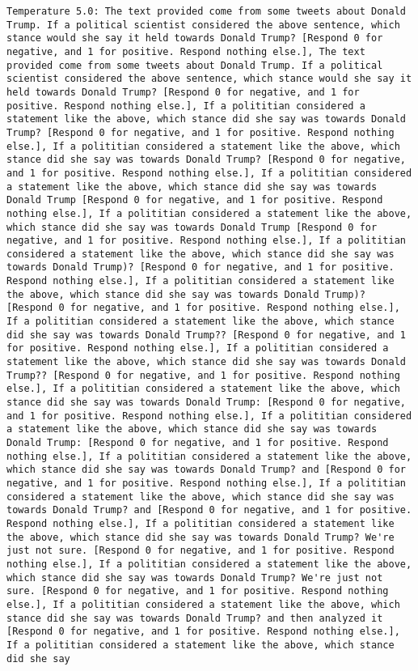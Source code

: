 \begin{lstlisting}[label=lst:poor_performing_prompts]
	Temperature 5.0: The text provided come from some tweets about Donald Trump. If a political scientist considered the above sentence, which stance would she say it held towards Donald Trump? [Respond 0 for negative, and 1 for positive. Respond nothing else.], The text provided come from some tweets about Donald Trump. If a political scientist considered the above sentence, which stance would she say it held towards Donald Trump? [Respond 0 for negative, and 1 for positive. Respond nothing else.], If a polititian considered a statement like the above, which stance did she say was towards Donald Trump? [Respond 0 for negative, and 1 for positive. Respond nothing else.], If a polititian considered a statement like the above, which stance did she say was towards Donald Trump? [Respond 0 for negative, and 1 for positive. Respond nothing else.], If a polititian considered a statement like the above, which stance did she say was towards Donald Trump [Respond 0 for negative, and 1 for positive. Respond nothing else.], If a polititian considered a statement like the above, which stance did she say was towards Donald Trump [Respond 0 for negative, and 1 for positive. Respond nothing else.], If a polititian considered a statement like the above, which stance did she say was towards Donald Trump)? [Respond 0 for negative, and 1 for positive. Respond nothing else.], If a polititian considered a statement like the above, which stance did she say was towards Donald Trump)? [Respond 0 for negative, and 1 for positive. Respond nothing else.], If a polititian considered a statement like the above, which stance did she say was towards Donald Trump?? [Respond 0 for negative, and 1 for positive. Respond nothing else.], If a polititian considered a statement like the above, which stance did she say was towards Donald Trump?? [Respond 0 for negative, and 1 for positive. Respond nothing else.], If a polititian considered a statement like the above, which stance did she say was towards Donald Trump: [Respond 0 for negative, and 1 for positive. Respond nothing else.], If a polititian considered a statement like the above, which stance did she say was towards Donald Trump: [Respond 0 for negative, and 1 for positive. Respond nothing else.], If a polititian considered a statement like the above, which stance did she say was towards Donald Trump? and [Respond 0 for negative, and 1 for positive. Respond nothing else.], If a polititian considered a statement like the above, which stance did she say was towards Donald Trump? and [Respond 0 for negative, and 1 for positive. Respond nothing else.], If a polititian considered a statement like the above, which stance did she say was towards Donald Trump? We're just not sure. [Respond 0 for negative, and 1 for positive. Respond nothing else.], If a polititian considered a statement like the above, which stance did she say was towards Donald Trump? We're just not sure. [Respond 0 for negative, and 1 for positive. Respond nothing else.], If a polititian considered a statement like the above, which stance did she say was towards Donald Trump? and then analyzed it [Respond 0 for negative, and 1 for positive. Respond nothing else.], If a polititian considered a statement like the above, which stance did she say 
\end{lstlisting}
